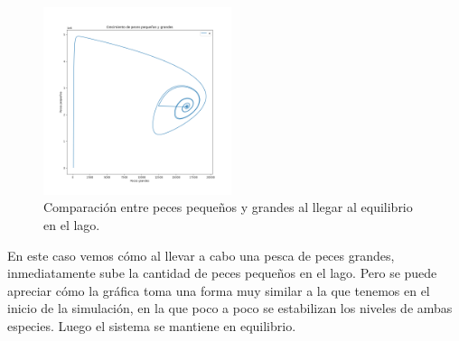 \documentclass[11pt,a4paper]{report}
\begin{document}
\begin{figure}[H]
	\begin{center}
		\includegraphics[width=0.49\textwidth]{img/Cap-3/apartado-2/pequenyos_grandes_pesca_25.png}
		\caption{Comparación entre peces pequeños y grandes al llegar al equilibrio en el lago.}
		\label{fig:f3}
	\end{center}
\end{figure}

En este caso vemos cómo al llevar a cabo una pesca de peces grandes, inmediatamente sube la cantidad de peces pequeños en el lago. Pero se puede apreciar cómo la gráfica toma una forma muy similar a la que tenemos en el inicio de la simulación, en la que poco a poco se estabilizan los niveles de ambas especies. Luego el sistema se mantiene en equilibrio.
\end{document}
